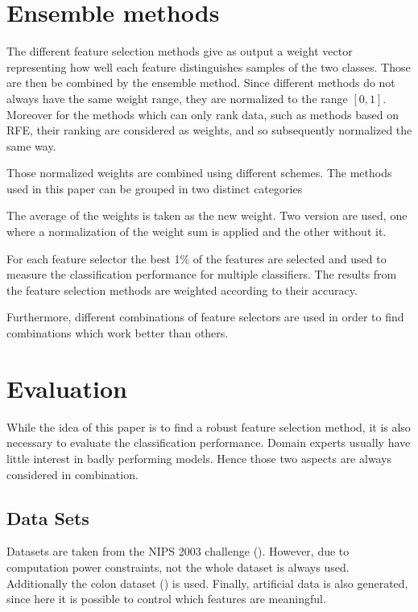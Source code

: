 \documentclass[twoside,11pt]{article}
\begin{document}
\section{Ensemble methods}

The different feature selection methods give as output a weight vector representing how well each feature distinguishes samples of the two classes. Those are then be combined by the ensemble method. Since different methods do not always have the same weight range, they are normalized to the range $[0,1]$. Moreover for the methods which can only rank data, such as methods based on RFE, their ranking are considered as weights, and so subsequently normalized the same way. 

Those normalized weights are combined using different schemes. The methods used in this paper can be grouped in two distinct categories 

\begin{description}[align=left]
\item [Linear aggregation :] The average of the weights is taken as the new weight. Two version are used, one where a normalization of the weight sum is applied and the other without it.

\item [Performance related aggregation :] For each feature selector the best 1\% of the features are selected and used to measure the classification performance for multiple classifiers. The results from the feature selection methods are weighted according to their accuracy.
\end{description}

Furthermore, different combinations of feature selectors are used in order to find combinations which work better than others.

\section{Evaluation}

While the idea of this paper is to find a robust feature selection method, it is also necessary to evaluate the classification performance. Domain experts usually have little interest in badly performing models. Hence those two aspects are always considered in combination.

\subsection{Data Sets}
Datasets are taken from the NIPS 2003 challenge (\cite{NIPS}). However, due to computation power constraints, not the whole dataset is always used. Additionally the colon dataset (\cite{alon1999broad}) is used. Finally, artificial data is also generated, since here it is possible to control which features are meaningful. 
\end{document}
